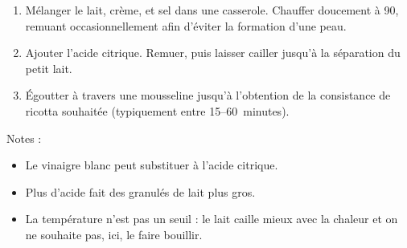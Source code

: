 
\begin{ingredients}
\end{ingredients}


\begin{recipe}
  \begin{enumerate}

  \item Mélanger le lait, crème, et sel dans une casserole.  Chauffer
    doucement à 90\degreeC, remuant occasionnellement afin d'éviter la
    formation d'une peau.
    
  \item Ajouter l'acide citrique.  Remuer, puis laisser cailler
    jusqu'à la séparation du petit lait.
    
  \item Égoutter à travers une mousseline jusqu'à l'obtention de la
    consistance de ricotta souhaitée (typiquement entre 15--60~minutes).

  \end{enumerate}
\end{recipe}

Notes :
\begin{itemize}
\item Le vinaigre blanc peut substituer à l'acide citrique.
\item Plus d'acide fait des granulés de lait plus gros.
\item La température n'est pas un seuil : le lait caille mieux avec la
  chaleur et on ne souhaite pas, ici, le faire bouillir.
\end{itemize}


